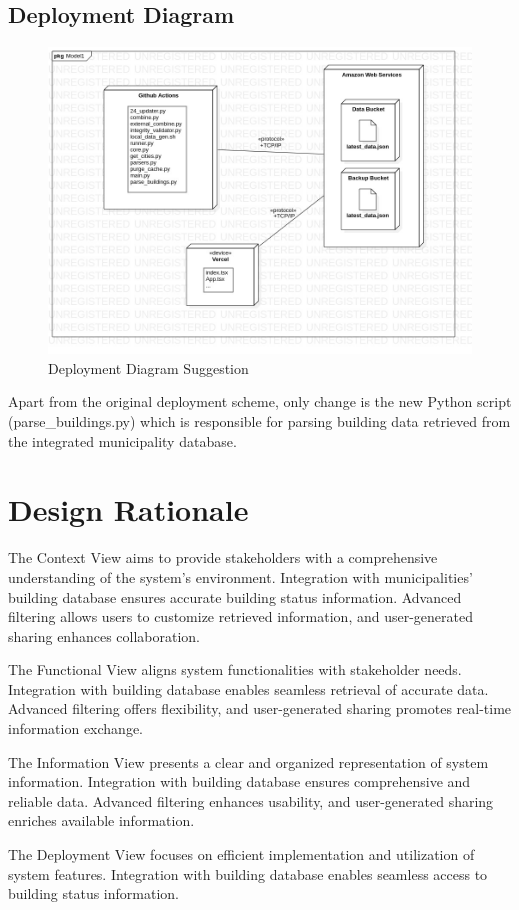 \documentclass[12pt]{report}
\begin{document}
\subsection{Deployment Diagram}
\begin{figure}[H]
    \includegraphics[scale=0.5]{deploy2}
    \centering
    \caption{Deployment Diagram Suggestion}
\end{figure}

Apart from the original deployment scheme, only change is the new Python script (parse\_buildings.py) which is responsible for parsing building data retrieved from the integrated municipality database.

\section{Design Rationale}
The Context View aims to provide stakeholders with a comprehensive understanding of the system's environment. Integration with municipalities' building database ensures accurate building status information. Advanced filtering allows users to customize retrieved information, and user-generated sharing enhances collaboration.
\newline

The Functional View aligns system functionalities with stakeholder needs. Integration with building database enables seamless retrieval of accurate data. Advanced filtering offers flexibility, and user-generated sharing promotes real-time information exchange.
\newline

The Information View presents a clear and organized representation of system information. Integration with building database ensures comprehensive and reliable data. Advanced filtering enhances usability, and user-generated sharing enriches available information.
\newline

The Deployment View focuses on efficient implementation and utilization of system features. Integration with building database enables seamless access to building status information.
\end{document}
